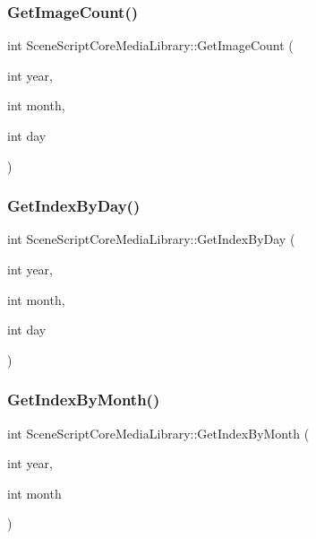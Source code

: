 \hypertarget{class_scene_script_core_media_library_a0f492c5e7ad3229385a3754bc921b785}{}\label{class_scene_script_core_media_library_a0f492c5e7ad3229385a3754bc921b785} 
\subsubsection{\texorpdfstring{Get\+Image\+Count()}{GetImageCount()}}
{\footnotesize\ttfamily int Scene\+Script\+Core\+Media\+Library\+::\+Get\+Image\+Count (\begin{DoxyParamCaption}\item[{int}]{year,  }\item[{int}]{month,  }\item[{int}]{day }\end{DoxyParamCaption})}

\hypertarget{class_scene_script_core_media_library_a5c216bfe2be428a4eb9ea20e6e88b524}{}\label{class_scene_script_core_media_library_a5c216bfe2be428a4eb9ea20e6e88b524} 
\subsubsection{\texorpdfstring{Get\+Index\+By\+Day()}{GetIndexByDay()}}
{\footnotesize\ttfamily int Scene\+Script\+Core\+Media\+Library\+::\+Get\+Index\+By\+Day (\begin{DoxyParamCaption}\item[{int}]{year,  }\item[{int}]{month,  }\item[{int}]{day }\end{DoxyParamCaption})}

\hypertarget{class_scene_script_core_media_library_aa6843715e94126a2825108b43533a1b5}{}\label{class_scene_script_core_media_library_aa6843715e94126a2825108b43533a1b5} 
\subsubsection{\texorpdfstring{Get\+Index\+By\+Month()}{GetIndexByMonth()}}
{\footnotesize\ttfamily int Scene\+Script\+Core\+Media\+Library\+::\+Get\+Index\+By\+Month (\begin{DoxyParamCaption}\item[{int}]{year,  }\item[{int}]{month }\end{DoxyParamCaption})}

